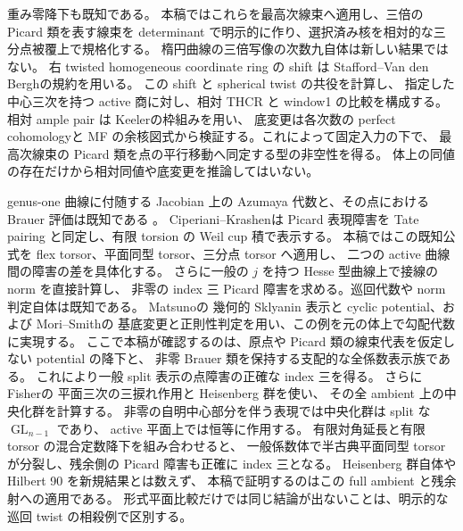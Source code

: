 \documentclass[11pt,a4paper]{ltjsarticle}
\numberwithin{equation}{section}
\begin{document}
重み零降下\cite[Proposition~4.10]{NFMBerghSchnurer}も既知である。
本稿ではこれらを最高次線束へ適用し、三倍の Picard 類を表す線束を
determinant で明示的に作り、選択済み核を相対的な三分点被覆上で規格化する。
楕円曲線の三倍写像の次数九\cite{NFMStacksMultiplication}自体は新しい結果ではない。
右 twisted homogeneous coordinate ring の shift は
Stafford--Van den Bergh\cite[\S3, equation~(3.1)]{NFMStaffordVdB}の規約を用いる。
この shift と spherical twist の共役を計算し、
指定した中心三次を持つ active 商に対し、相対 THCR と window1 の比較を構成する。
相対 ample pair は Keeler\cite[Proposition~7.2, Lemma~7.6]{NFMKeelerAmple}の枠組みを用い、
底変更は各次数の perfect cohomology\cite{NFMStacksPerfectBasechange}と
MF の余核図式から検証する。これによって固定入力の下で、
最高次線束の Picard 類を点の平行移動へ同定する型の非空性を得る。
体上の同値の存在だけから相対同値や底変更を推論してはいない。

genus-one 曲線に付随する Jacobian 上の Azumaya 代数と、その点における
Brauer 評価は既知である
\cite[Theorems~1.1--1.2, Corollary~1.4]{NFMFisherGenusOneAlgebras}。
Ciperiani--Krashen\cite[Theorems~3.1, 3.7]{NFMCiperianiKrashen}は
Picard 表現障害を Tate pairing と同定し、有限 torsion の Weil cup 積で表示する。
本稿ではこの既知公式を flex torsor、平面同型 torsor、三分点 torsor へ適用し、
二つの active 曲線間の障害の差を具体化する。
さらに一般の $j$ を持つ Hesse 型曲線上で接線の norm を直接計算し、
非零の index 三 Picard 障害を求める。巡回代数や norm 判定\cite{NFMMilneCFT}自体は既知である。
Matsuno\cite[\S2.4, Lemma~2.16, Theorem~3.3, \S4]{NFMMatsunoElliptic}の
幾何的 Sklyanin 表示と cyclic potential、および
Mori--Smith\cite[Proposition~2.11, Theorem~4.2(1)]{MoriSmith}の
基底変更と正則性判定を用い、この例を元の体上で勾配代数に実現する。
ここで本稿が確認するのは、原点や Picard 類の線束代表を仮定しない potential の降下と、
非零 Brauer 類を保持する支配的な全係数表示族である。
これにより一般 split 表示の点障害の正確な index 三を得る。
さらに Fisher\cite[proof of Lemma~2.3, \S9.5]{NFMFisherTernary}の
平面三次の三捩れ作用と Heisenberg 群を使い、
その全 ambient 上の中央化群を計算する。
非零の自明中心部分を伴う表現では中央化群は split な $\operatorname{GL}_{n-1}$ であり、
active 平面上では恒等に作用する。
有限対角延長と有限 torsor の混合定数降下を組み合わせると、
一般係数体で半古典平面同型 torsor が分裂し、残余側の Picard 障害も正確に index 三となる。
Heisenberg 群自体や Hilbert 90 を新規結果とは数えず、
本稿で証明するのはこの full ambient と残余射への適用である。
形式平面比較だけでは同じ結論が出ないことは、明示的な巡回 twist の相殺例で区別する。
\end{document}
